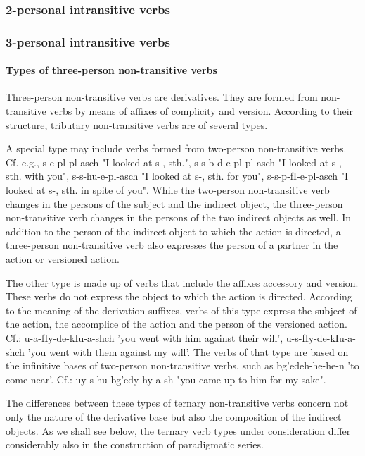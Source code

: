 \documentclass[a4paper,12pt]{book}
\newcommand{\1}[1]{\textbf{\emph{#1}}} %
\newcommand{\2}[1]{\textbf{[#1]}} %
\newcommand{\3}[1]{\fontsize{11pt}{0cm}\textbf{\emph{#1}}} %
\newcommand{\4}[1]{\fontsize{10pt}{0cm}\emph{#1}}	%
\newcommand{\5}[1]{\textbf{/#1/}} %
\newcommand{\6}[1]{\textbf{[#1]}} %
\newcommand{\7}[1]{\fontsize{12pt}{0cm}\emph{#1}} %
\newcommand{\8}[1]{\fontsize{12pt}{0cm}`#1'} %
\newcommand{\9}[1]{\fontsize{12pt}{0cm}(lit. `#1')} %
\begin{document}
\subsubsection{2-personal intransitive verbs}
\subsubsection{3-personal intransitive verbs}
\paragraph{Types of three-person non-transitive verbs}
Three-person non-transitive verbs are derivatives. They are formed from non-transitive verbs by means of affixes of complicity and version. According to their structure, tributary non-transitive verbs are of several types.

A special type may include verbs formed from two-person non-transitive verbs. Cf. e.g., s-e-pl-pl-asch "I looked at s-, sth.", s-s-b-d-e-pl-pl-asch "I looked at s-, sth. with you", s-s-hu-e-pl-asch "I looked at s-, sth. for you", s-s-p-fI-e-pl-asch "I looked at s-, sth. in spite of you". While the two-person non-transitive verb changes in the persons of the subject and the indirect object, the three-person non-transitive verb changes in the persons of the two indirect objects as well. In addition to the person of the indirect object to which the action is directed, a three-person non-transitive verb also expresses the person of a partner in the action or versioned action.

The other type is made up of verbs that include the affixes accessory and version. These verbs do not express the object to which the action is directed. According to the meaning of the derivation suffixes, verbs of this type express the subject of the action, the accomplice of the action and the person of the versioned action. Cf.: u-a-fIy-de-kIu-a-shch 'you went with him against their will', u-s-fIy-de-kIu-a-shch 'you went with them against my will'. The verbs of that type are based on the infinitive bases of two-person non-transitive verbs, such as bg'edeh-he-he-n 'to come near'. Cf.: uy-s-hu-bg'edy-hy-a-sh "you came up to him for my sake".

The differences between these types of ternary non-transitive verbs concern not only the nature of the derivative base but also the composition of the indirect objects. As we shall see below, the ternary verb types under consideration differ considerably also in the construction of paradigmatic series.
\end{document}
